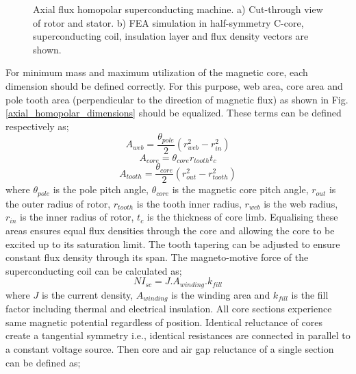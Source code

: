 \documentclass[final,peerreview,onecolumn]{IEEEtran}
\begin{document}
\begin{figure}[h]
\centerline{
\hfil
{}
}
\caption{Axial flux homopolar superconducting machine. a) Cut-through view of rotor and stator. b) FEA simulation in half-symmetry C-core, superconducting coil, insulation layer and flux density vectors are shown.}
\end{figure}

For minimum mass and maximum utilization of the magnetic core, each dimension should be defined correctly. For this purpose, web area, core area and pole tooth area (perpendicular to the direction of magnetic flux) as shown in Fig. \ref{axial_homopolar_dimensions} should be equalized. These terms can be defined respectively as;
\begin{equation}
    A_{web}=\frac{\theta_{pole}}{2}(r_{web}^2-r_{in}^2)
\end{equation}
\begin{equation}
    A_{core}=\theta_{core}r_{tooth}t_{c}
\end{equation}
\begin{equation}
    A_{tooth}=\frac{\theta_{core}}{2}(r_{out}^2-r_{tooth}^2)
    \label{A_tooth}
\end{equation}
where $\theta_{pole}$ is the pole pitch angle, $\theta_{core}$ is the magnetic core pitch angle, $r_{out}$ is the outer radius of rotor, $r_{tooth}$ is the tooth inner radius, $r_{web}$  is the web radius, $r_{in}$ is the inner radius of rotor,  $t_{c}$ is the thickness of core limb. Equalising these areas ensures equal flux densities through the core and allowing the core to be excited up to its saturation limit. The tooth tapering can be adjusted to ensure constant flux density through its span. The magneto-motive force of the superconducting coil can be calculated as;
\begin{equation}
    NI_{sc}=J.A_{winding}.k_{fill}
\end{equation}
where $J$ is the current density, $A_{winding}$ is the winding area and $k_{fill}$ is the fill factor including thermal and electrical insulation. All core sections experience same magnetic potential regardless of position. Identical reluctance of cores create a tangential symmetry i.e., identical resistances are connected in parallel to a constant voltage source. Then core and air gap reluctance of a single section can be defined as;
\end{document}
